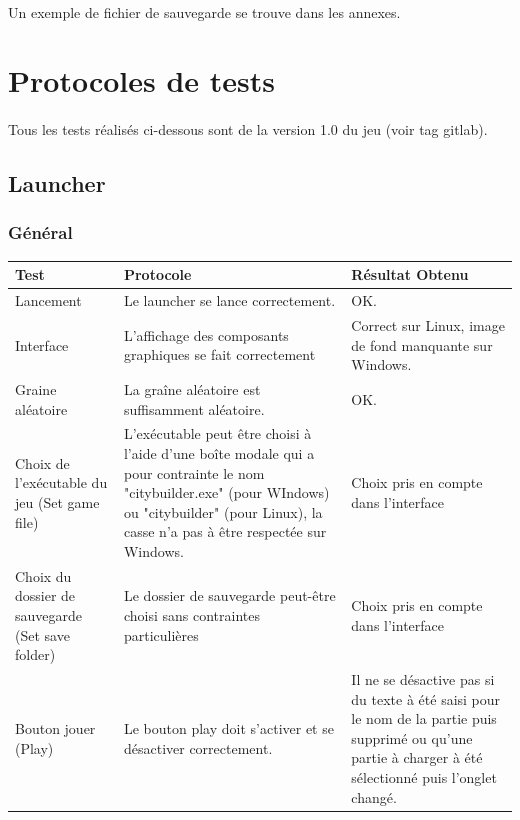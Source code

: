 \documentclass[a4paper,10pt,openany,oneside]{report}
\begin{document}
\paragraph{}
Un exemple de fichier de sauvegarde se trouve dans les annexes.

\section{Protocoles de tests}
\thispagestyle{headings}
\paragraph{}
Tous les tests réalisés ci-dessous sont de la version 1.0 du jeu (voir tag gitlab).
\subsection{Launcher}

\subsubsection{Général}
\begin{center}
	\begin{tabular}{| p{3cm} | p{6cm} | p{6cm} |}
	\hline
		 \textbf{Test} & \textbf{Protocole} & \textbf{Résultat Obtenu}
		 \\ \hline
		 Lancement & Le launcher se lance correctement. & OK.
		 \\ \hline
		 Interface & L'affichage des composants graphiques se fait correctement & Correct sur Linux, image de fond manquante sur Windows.
		 \\ \hline
		 Graine aléatoire & La graîne aléatoire est suffisamment aléatoire. & OK.
		 \\ \hline
		Choix de l'exécutable du jeu (Set game file)&
		L'exécutable peut être choisi à l'aide d'une boîte modale qui a pour contrainte le nom "citybuilder.exe" (pour WIndows) ou "citybuilder" (pour Linux), la casse n'a pas à être respectée sur Windows. &
		Choix pris en compte dans l'interface
		\\ \hline
		Choix du dossier de sauvegarde (Set save folder) &
		Le dossier de sauvegarde peut-être choisi sans contraintes particulières &
		Choix pris en compte dans l'interface
		\\ \hline
		Bouton jouer (Play) &
		Le bouton play doit s'activer et se désactiver correctement. &
		Il ne se désactive pas si du texte à été saisi pour le nom de la partie puis supprimé ou qu'une partie à charger à été sélectionné puis l'onglet changé.
		\\ \hline
	\end{tabular}
\end{center}
\end{document}

